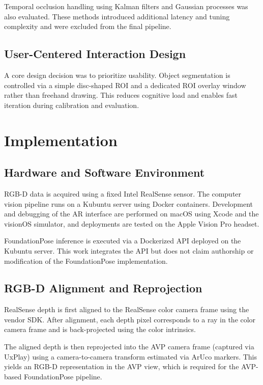 \documentclass[11pt]{article}
\begin{document}
Temporal occlusion handling using Kalman filters and Gaussian processes was also evaluated. These methods introduced additional latency and tuning complexity and were excluded from the final pipeline.

\subsection{User-Centered Interaction Design}

A core design decision was to prioritize usability. Object segmentation is controlled via a simple disc-shaped ROI and a dedicated ROI overlay window rather than freehand drawing. This reduces cognitive load and enables fast iteration during calibration and evaluation.

\section{Implementation}
\label{sec:implementation}

\subsection{Hardware and Software Environment}

RGB-D data is acquired using a fixed Intel RealSense sensor. The computer vision pipeline runs on a Kubuntu server using Docker containers. Development and debugging of the AR interface are performed on macOS using Xcode and the visionOS simulator, and deployments are tested on the Apple Vision Pro headset.

FoundationPose inference is executed via a Dockerized API deployed on the Kubuntu server. This work integrates the API but does not claim authorship or modification of the FoundationPose implementation.

\subsection{RGB-D Alignment and Reprojection}

RealSense depth is first aligned to the RealSense color camera frame using the vendor SDK. After alignment, each depth pixel corresponds to a ray in the color camera frame and is back-projected using the color intrinsics.

The aligned depth is then reprojected into the AVP camera frame (captured via UxPlay) using a camera-to-camera transform estimated via ArUco markers. This yields an RGB-D representation in the AVP view, which is required for the AVP-based FoundationPose pipeline.
\end{document}
